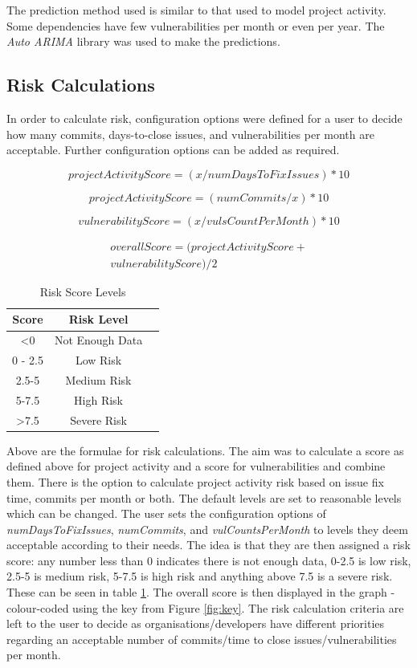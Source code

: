 \documentclass[conference]{IEEEtran}
\begin{document}
The prediction method used is similar to that used to model project activity. Some dependencies have few vulnerabilities per month or even per year. The \textit{Auto ARIMA} library was used to make the predictions. 

\subsection{Risk Calculations}
In order to calculate  risk, configuration options were defined for a user to decide how many commits, days-to-close issues, and vulnerabilities per month are acceptable. Further configuration options can be added as required. 

\[ projectActivityScore = ( x / numDaysToFixIssues ) * 10\]

\[ projectActivityScore = ( numCommits / x ) * 10\]

\[vulnerabilityScore = ( x / vulsCountPerMonth ) * 10\]

\begin{multline*}
  overallScore = ( projectActivityScore +\\ vulnerabilityScore) / 2 
\end{multline*}

\begin{table}
 \caption{Risk Score Levels}
\label{risklevels}
\begin{center}
\begin{tabular}{|c|c|c|}
\hline
    \textbf{Score} & \textbf{Risk Level} \\ \hline
    \textless  0 & Not Enough Data \\ \hline
    0 - 2.5 & Low Risk \\ \hline
    2.5-5 & Medium Risk \\ \hline
    5-7.5 & High Risk \\ \hline
    \textgreater 7.5  & Severe Risk \\ \hline
\end{tabular}
\end{center}
\end{table}

Above are the formulae for risk calculations. The aim was to calculate a score as defined above for project activity and a score for vulnerabilities and combine them. There is the option to calculate project activity risk based on issue fix time, commits per month or both. The default levels are set to reasonable levels which can be changed. The user sets the configuration options of \textit{numDaysToFixIssues}, \textit{numCommits}, and \textit{vulCountsPerMonth} to levels they deem acceptable according to their needs. The idea is that they are then assigned a risk score: any number less than 0 indicates there is not enough data, 0-2.5 is low risk, 2.5-5 is medium risk, 5-7.5 is high risk and anything above 7.5 is a severe risk. These can be seen in table \ref{risklevels}. The overall score is then displayed in the graph - colour-coded using the key from Figure \ref{fig:key}. The risk calculation criteria are left to the user to decide as organisations/developers have different priorities regarding an acceptable number of commits/time to close issues/vulnerabilities per month. 
\end{document}
